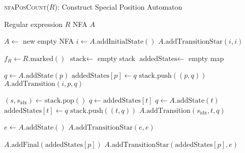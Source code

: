 \begin{algorithm}[H]
\caption{\textsc{nfaPosCount}($R$): Construct Special Position Automaton}
\label{alg:nfaPosCount}
\begin{small}
\begin{algorithmic}[1]
\Require Regular expression $R$
\Ensure NFA $A$

\State $A \gets$ new empty NFA
\State $i \gets A.\text{addInitialState}()$
\State $A.\text{addTransitionStar}(i, i)$ 

\State $f_R \gets R.\text{marked}()$
\State $\text{stack} \gets$ empty stack
\State $\text{addedStates} \gets$ empty map

    \State $q \gets A.\text{addState}(p)$
    \State $\text{addedStates}[p] \gets q$
    \State $\text{stack}.\text{push}((p, q))$
    \State $A.\text{addTransition}(i, p, q)$
\EndFor


    \State $(s, s_{\text{idx}}) \gets \text{stack}.\text{pop}()$
            \State $q \gets \text{addedStates}[t]$
        \Else
            \State $q \gets A.\text{addState}(t)$
            \State $\text{addedStates}[t] \gets q$
            \State $\text{stack}.\text{push}((t, q))$
        \EndIf
        \State $A.\text{addTransition}(s_{\text{idx}}, t, q)$
    \EndFor
\EndWhile

\State $e \gets A.\text{addState}()$
\State $A.\text{addTransitionStar}(e, e)$

        \State $A.\text{addFinal}(\text{addedStates}[p])$
        \State $A.\text{addTransitionStar}(\text{addedStates}[p], e)$
    \EndIf
\EndFor

\end{algorithmic}
\end{small}
\end{algorithm}